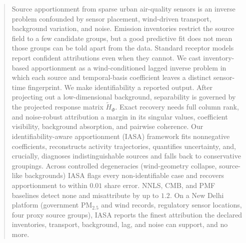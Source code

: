 \begin{abstract}
Source apportionment from sparse urban air-quality sensors is an inverse problem confounded by sensor placement, wind-driven transport, background variation, and noise.  Emission inventories restrict the source field to a few candidate groups, but a good predictive fit does not mean those groups can be told apart from the data.  Standard receptor models report confident attributions even when they cannot.
We cast inventory-based apportionment as a wind-conditioned lagged inverse problem in which each source and temporal-basis coefficient leaves a distinct sensor-time fingerprint.  We make identifiability a reported output.  After projecting out a low-dimensional background, separability is governed by the projected response matrix \(\widetilde H_\Phi\).  Exact recovery needs full column rank, and noise-robust attribution a margin in its singular values, coefficient visibility, background absorption, and pairwise coherence.  Our identifiability-aware apportionment (IASA) framework fits nonnegative coefficients, reconstructs activity trajectories, quantifies uncertainty, and, crucially, diagnoses indistinguishable sources and falls back to conservative groupings.  Across controlled degeneracies (wind-geometry collapse, source-like backgrounds) IASA flags every non-identifiable case and recovers apportionment to within \(0.01\) share error.  NNLS, CMB, and PMF baselines detect none and misattribute by up to \(1.2\).  On a New Delhi platform (government PM\(_{2.5}\) and wind records, regulatory sensor locations, four proxy source groups), IASA reports the finest attribution the declared inventories, transport, background, lag, and noise can support, and no more.
\end{abstract}
